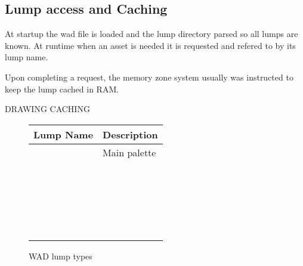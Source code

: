 \subsection{Lump access and Caching}
At startup the wad file is loaded and the lump directory parsed so all lumps are known. At runtime when an asset is needed it is requested and refered to by its lump name.\\
\par
{}
\par
 Upon completing a request, the memory zone system usually was instructed to keep the lump cached in RAM.\\
\par
DRAWING CACHING\\
\par
\begin{figure}[H]
\centering  
\begin{tabularx}{\textwidth}{ L{0.2}  L{0.8}}
  \toprule
  \textbf{Lump Name} &  \textbf{Description} \\
   
  \toprule 
   & Main palette \\
   &  \\
   &  \\
  \toprule
   &  \\
   &  \\
   &  \\
   &  \\
   &  \\
   &  \\
   &  \\
   &  \\
   &  \\
   &  \\
   &  \\
  \toprule
   &  \\
   &  \\
   &  \\
  \toprule
   &  \\
   &  \\
   &  \\
   &  \\
   &  \\  
   &  \\  
   \toprule
\end{tabularx}
\caption{WAD lump types}
\end{figure}
\par


